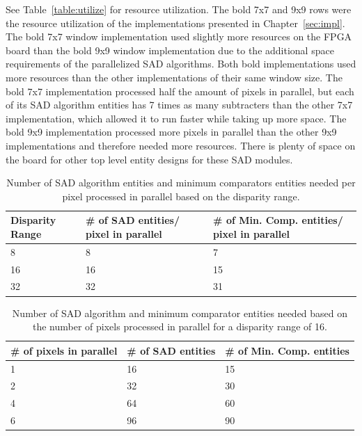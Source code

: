 See Table~\ref{table:utilize} for resource utilization. The bold 7x7 and 9x9 rows were the resource utilization of the implementations presented in Chapter~\ref{sec:impl}. The bold 7x7 window implementation used slightly more resources on the FPGA board than the bold 9x9 window implementation due to the additional space requirements of the parallelized SAD algorithms. Both bold implementations used more resources than the other implementations of their same window size. The bold 7x7 implementation processed half the amount of pixels in parallel, but each of its SAD algorithm entities has 7 times as many subtracters than the other 7x7 implementation, which allowed it to run faster while taking up more space. The bold 9x9 implementation processed more pixels in parallel than the other 9x9 implementations and therefore needed more resources. There is plenty of space on the board for other top level entity designs for these SAD modules.

\begin{table}
\begin{center}
	\begin{tabular}{| p{2cm} | p{4cm} | p{5cm} |}
		\hline 
		\rowstyle{\bfseries} Disparity Range & 
		\rowstyle{\bfseries} \# of SAD entities/ pixel in parallel &
		\rowstyle{\bfseries} \# of Min. Comp. entities/ pixel in parallel
		\\ \hline
		8 & 8 & 7
		\\ \hline 
		\rowstyle{\bfseries} 16 & 
		\rowstyle{\bfseries} 16 & 
		\rowstyle{\bfseries} 15
		\\ \hline
		32 & 32 & 31
		\\ \hline 
	\end{tabular}
	\captionfonts
	\caption{Number of SAD algorithm entities and minimum comparators entities needed per pixel processed in parallel based on the disparity range.}
	\label{table:dispRange}
\end{center}
\end{table}

\begin{table}
\begin{center}
	\begin{tabular}{| p{3cm} | p{2.7cm} | p{3.7cm} |}
		\hline 
		\rowstyle{\bfseries} \# of pixels in parallel & 
		\rowstyle{\bfseries} \# of SAD entities &
		\rowstyle{\bfseries} \# of Min. Comp. entities 
		\\ \hline
		1 & 16 & 15
		\\ \hline 
		\rowstyle{\bfseries} 2 & 
		\rowstyle{\bfseries} 32 & 
		\rowstyle{\bfseries} 30
		\\ \hline 
		\rowstyle{\bfseries} 4 & 
		\rowstyle{\bfseries} 64 & 
		\rowstyle{\bfseries} 60
		\\ \hline
		6 & 96 & 90
		\\ \hline 
	\end{tabular}
	\captionfonts
	\caption{Number of SAD algorithm and minimum comparator entities needed based on the number of pixels processed in parallel for a disparity range of 16.}
	\label{table:pixelInParallel}
\end{center}
\end{table}

